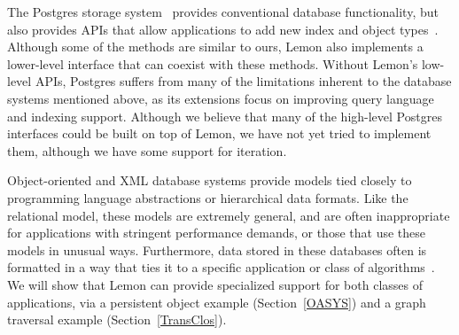 \documentclass[10pt,letterpaper,twocolumn,english]{article}
\newcommand{\yad}{Lemon\xspace}
\begin{document}
The Postgres storage system~\cite{postgres} provides conventional
database functionality, but also provides APIs that allow applications to 
add new index and object types~\cite{newTypes}.  Although some of the methods are
similar to ours, \yad also implements a lower-level
interface that can coexist with these methods.  Without \yad's
low-level APIs, Postgres suffers from many of the limitations inherent
to the database systems mentioned above, as its extensions focus on
improving
query language and indexing support.
Although we
believe that many of the high-level Postgres interfaces could be built
on top of \yad, we have not yet tried to implement them, although
we have some support for iteration.

Object-oriented and XML database systems provide models tied closely
to programming language abstractions or hierarchical data formats.
Like the relational model, these models are extremely general, and are
often inappropriate for applications with stringent performance
demands, or those that use  these models in unusual ways.  Furthermore, data stored in these databases
often is formatted in a way that ties it to a specific application or
class of algorithms~\cite{lamb}.  We will show that \yad can provide 
specialized support for both classes of applications, via a persistent 
object example (Section~\ref{OASYS}) and a graph traversal example 
(Section~\ref{TransClos}).

\end{document}
